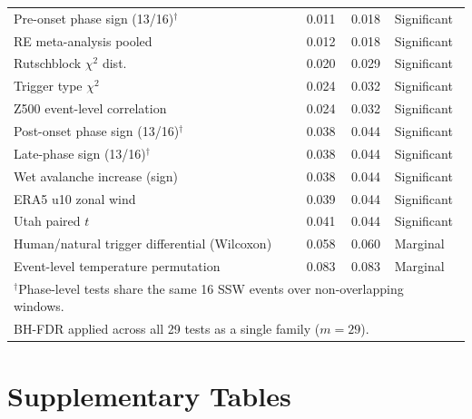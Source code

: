 \documentclass[11pt,letterpaper]{article}
\begin{document}
\begin{table}[!ht]
\begin{tabular}{lccl}
Pre-onset phase sign (13/16)$^\dag$ & 0.011 & 0.018 & Significant \\
RE meta-analysis pooled & 0.012 & 0.018 & Significant \\
Rutschblock $\chi^2$ dist. & 0.020 & 0.029 & Significant \\
Trigger type $\chi^2$ & 0.024 & 0.032 & Significant \\
Z500 event-level correlation & 0.024 & 0.032 & Significant \\
Post-onset phase sign (13/16)$^\dag$ & 0.038 & 0.044 & Significant \\
Late-phase sign (13/16)$^\dag$ & 0.038 & 0.044 & Significant \\
Wet avalanche increase (sign) & 0.038 & 0.044 & Significant \\
ERA5 u10 zonal wind & 0.039 & 0.044 & Significant \\
Utah paired $t$ & 0.041 & 0.044 & Significant \\
Human/natural trigger differential (Wilcoxon) & 0.058 & 0.060 & Marginal \\
Event-level temperature permutation & 0.083 & 0.083 & Marginal \\
\bottomrule
\multicolumn{4}{l}{\footnotesize $^\dag$Phase-level tests share the same 16 SSW events over non-overlapping windows.} \\
\multicolumn{4}{l}{\footnotesize BH-FDR applied across all 29 tests as a single family ($m = 29$).} \\
\bottomrule
\end{tabular}
\end{table}


\section{Supplementary Tables}
\end{document}
